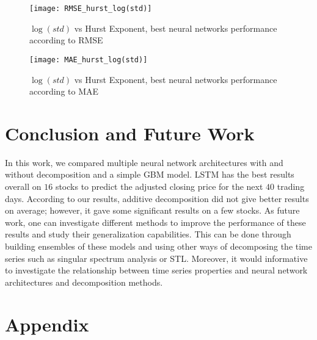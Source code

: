 \documentclass[12pt, A4]{article}
\begin{document}
\begin{figure}[H]
	\centering
	\texttt{[image: RMSE\_hurst\_log(std)]}
	\caption{$\log(std)$ vs Hurst Exponent, best neural networks performance according to RMSE}
	\label{RMSE_hurst_log(std)}
\end{figure}

\begin{figure}[H]
	\centering
	\texttt{[image: MAE\_hurst\_log(std)]}
	\caption{$\log(std)$ vs Hurst Exponent, best neural networks performance according to MAE}
	\label{MAE_hurst_log(std)}
\end{figure}

\section{Conclusion and Future Work}
In this work, we compared multiple neural network architectures with and without decomposition and a simple GBM model. LSTM has the best results overall on $16$ stocks to predict the adjusted closing price for the next $40$ trading days. According to our results, additive decomposition did not give better results on average; however, it gave some significant results on a few stocks. As future work, one can investigate different methods to improve the performance of these results and study their generalization capabilities. This can be done through building ensembles of these models and using other ways of decomposing the time series such as singular spectrum analysis or STL.  Moreover, it would informative to investigate the relationship between time series properties and neural network architectures and decomposition methods.




\clearpage

\section{Appendix}
\end{document}
